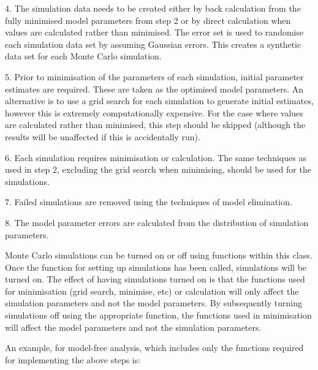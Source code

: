  4.  The simulation data needs to be created either by back calculation from the fully minimised model parameters from step 2 or by direct calculation when values are calculated rather than minimised.  The error set is used to randomise each simulation data set by assuming Gaussian errors.  This creates a synthetic data set for each Monte Carlo simulation. 
  

 5.  Prior to minimisation of the parameters of each simulation, initial parameter estimates are required.  These are taken as the optimised model parameters.  An alternative is to use a grid search for each simulation to generate initial estimates, however this is extremely computationally expensive.  For the case where values are calculated rather than minimised, this step should be skipped (although the results will be unaffected if this is accidentally run). 
  

 6.  Each simulation requires minimisation or calculation.  The same techniques as used in step 2, excluding the grid search when minimising, should be used for the simulations. 
  

 7.  Failed simulations are removed using the techniques of model elimination. 
  

 8.  The model parameter errors are calculated from the distribution of simulation parameters. 
  

 Monte Carlo simulations can be turned on or off using functions within this class.  Once the function for setting up simulations has been called, simulations will be turned on.  The effect of having simulations turned on is that the functions used for minimisation (grid search, minimise, etc) or calculation will only affect the simulation parameters and not the model parameters.  By subsequently turning simulations off using the appropriate function, the functions used in minimisation will affect the model parameters and not the simulation parameters. 
  

 An example, for model-free analysis, which includes only the functions required for implementing the above steps is: 
  



